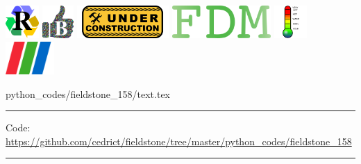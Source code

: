 \noindent
\includegraphics[height=1.25cm]{images/pictograms/replication}
\includegraphics[height=1.25cm]{images/pictograms/benchmark}
\includegraphics[height=1.25cm]{images/pictograms/under_construction}
\includegraphics[height=1.25cm]{images/pictograms/FDM}
\includegraphics[height=1.25cm]{images/pictograms/temperature}
\includegraphics[height=1.25cm]{images/pictograms/paraview}


\begin{flushright} {\tiny {\color{gray} python\_codes/fieldstone\_158/text.tex}} \end{flushright}

%

\par\noindent\rule{\textwidth}{0.4pt}

\begin{center}
\inpython \hspace{.5cm}
{\small Code: \url{https://github.com/cedrict/fieldstone/tree/master/python_codes/fieldstone_158}}
\end{center}

\par\noindent\rule{\textwidth}{0.4pt}



